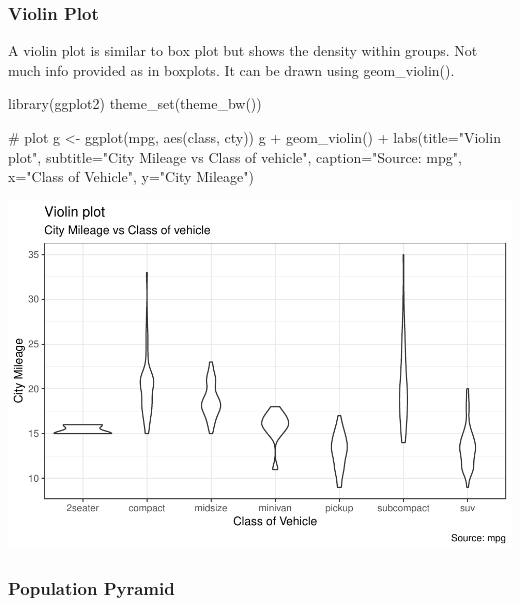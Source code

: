 \documentclass[a4paper]{article}
\newenvironment{Shaded}{}{}
\newcommand{\KeywordTok}[1]{\textcolor[rgb]{0.00,0.00,1.00}{#1}}
\newcommand{\DataTypeTok}[1]{#1}
\newcommand{\StringTok}[1]{\textcolor[rgb]{0.00,0.50,0.50}{#1}}
\newcommand{\CommentTok}[1]{\textcolor[rgb]{0.00,0.50,0.00}{#1}}
\newcommand{\OperatorTok}[1]{#1}
\newcommand{\NormalTok}[1]{#1}
\begin{document}
\newpage

\subsubsection{Violin Plot}\label{violin-plot}

A violin plot is similar to box plot but shows the density within
groups. Not much info provided as in boxplots. It can be drawn using
geom\_violin().

\begin{Shaded}
\begin{Highlighting}[]
\KeywordTok{library}\NormalTok{(ggplot2)}
\KeywordTok{theme_set}\NormalTok{(}\KeywordTok{theme_bw}\NormalTok{())}

\CommentTok{# plot}
\NormalTok{g <-}\StringTok{ }\KeywordTok{ggplot}\NormalTok{(mpg, }\KeywordTok{aes}\NormalTok{(class, cty))}
\NormalTok{g }\OperatorTok{+}\StringTok{ }\KeywordTok{geom_violin}\NormalTok{() }\OperatorTok{+}\StringTok{ }
\StringTok{  }\KeywordTok{labs}\NormalTok{(}\DataTypeTok{title=}\StringTok{"Violin plot"}\NormalTok{, }
       \DataTypeTok{subtitle=}\StringTok{"City Mileage vs Class of vehicle"}\NormalTok{,}
       \DataTypeTok{caption=}\StringTok{"Source: mpg"}\NormalTok{,}
       \DataTypeTok{x=}\StringTok{"Class of Vehicle"}\NormalTok{,}
       \DataTypeTok{y=}\StringTok{"City Mileage"}\NormalTok{)}
\end{Highlighting}
\end{Shaded}

\includegraphics{M24-ggplot2_Gallery_files/figure-latex/unnamed-chunk-30-1.pdf}

\newpage

\subsubsection{Population Pyramid}\label{population-pyramid}
\end{document}
